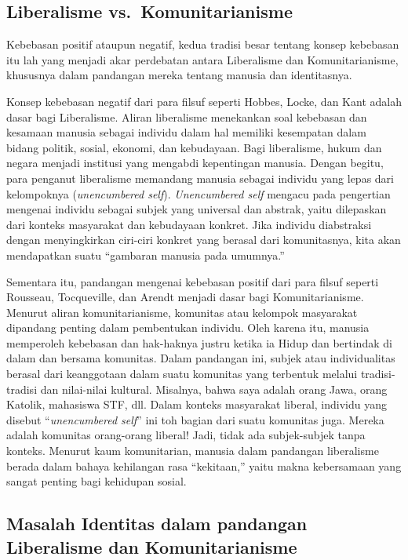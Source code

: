 \documentclass[11pt,twoside,a5paper,openany]{memoir}
\begin{document}
\hypertarget{liberalisme-vs.-komunitarianisme}{%
\subsection{Liberalisme
vs.~Komunitarianisme}\label{liberalisme-vs.-komunitarianisme}}

Kebebasan positif ataupun negatif, kedua tradisi besar tentang konsep
kebebasan itu lah yang menjadi akar perdebatan antara Liberalisme dan
Komunitarianisme, khususnya dalam pandangan mereka tentang manusia dan
identitasnya.

Konsep kebebasan negatif dari para filsuf seperti Hobbes, Locke, dan
Kant adalah dasar bagi Liberalisme. Aliran liberalisme menekankan soal
kebebasan dan kesamaan manusia sebagai individu dalam hal memiliki
kesempatan dalam bidang politik, sosial, ekonomi, dan kebudayaan. Bagi
liberalisme, hukum dan negara menjadi institusi yang mengabdi
kepentingan manusia. Dengan begitu, para penganut liberalisme memandang
manusia sebagai individu yang lepas dari kelompoknya (\emph{unencumbered
self}). \emph{Unencumbered self} mengacu pada pengertian mengenai
individu sebagai subjek yang universal dan abstrak, yaitu dilepaskan
dari konteks masyarakat dan kebudayaan konkret. Jika individu
diabstraksi dengan menyingkirkan ciri-ciri konkret yang berasal dari
komunitasnya, kita akan mendapatkan suatu ``gambaran manusia pada
umumnya.''

Sementara itu, pandangan mengenai kebebasan positif dari para filsuf
seperti Rousseau, Tocqueville, dan Arendt menjadi dasar bagi
Komunitarianisme. Menurut aliran komunitarianisme, komunitas atau
kelompok masyarakat dipandang penting dalam pembentukan individu. Oleh
karena itu, manusia memperoleh kebebasan dan hak-haknya justru ketika ia
Hidup dan bertindak di dalam dan bersama komunitas. Dalam pandangan ini,
subjek atau individualitas berasal dari keanggotaan dalam suatu
komunitas yang terbentuk melalui tradisi-tradisi dan nilai-nilai
kultural. Misalnya, bahwa saya adalah orang Jawa, orang Katolik,
mahasiswa STF, dll. Dalam konteks masyarakat liberal, individu yang
disebut ``\emph{unencumbered self}'' ini toh bagian dari suatu komunitas
juga. Mereka adalah komunitas orang-orang liberal! Jadi, tidak ada
subjek-subjek tanpa konteks. Menurut kaum komunitarian, manusia dalam
pandangan liberalisme berada dalam bahaya kehilangan rasa ``kekitaan,''
yaitu makna kebersamaan yang sangat penting bagi kehidupan sosial.

\hypertarget{masalah-identitas-dalam-pandangan-liberalisme-dan-komunitarianisme}{%
\subsection{Masalah Identitas dalam pandangan Liberalisme dan
Komunitarianisme}\label{masalah-identitas-dalam-pandangan-liberalisme-dan-komunitarianisme}}
\end{document}
